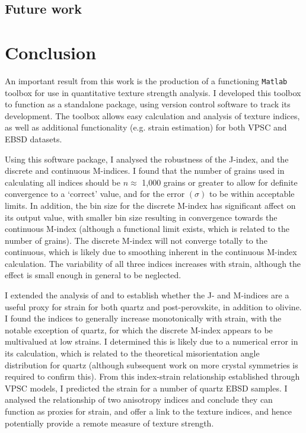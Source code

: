 \documentclass[a4paper,12pt,twoside]{report}
\numberwithin{equation}{chapter}
\begin{document}
\section{Future work}


\chapter{Conclusion} \label{chap:conclusion}
\vspace{-1cm}
An important result from this work is the production of a functioning \texttt{Matlab} toolbox for use in quantitative texture strength analysis. I developed this toolbox to function as a standalone package, using version control software to track its development. The toolbox allows easy calculation and analysis of texture indices, as well as additional functionality (e.g. strain estimation) for both VPSC and EBSD datasets. 

Using this software package, I analysed the robustness of the J-index, and the discrete and continuous M-indices. I found that the number of grains used in calculating all indices should be $n \approx$ 1,000 grains or greater to allow for definite convergence to a \lq{}correct\rq{} value, and for the error $(\sigma)$ to be within acceptable limits. In addition, the bin size for the discrete M-index has significant affect on its output value, with smaller bin size resulting in convergence towards the continuous M-index (although a functional limit exists, which is related to the number of grains). The discrete M-index will not converge totally to the continuous, which is likely due to smoothing inherent in the continuous M-index calculation. The variability of all three indices increases with strain, although the effect is small enough in general to be neglected.

I extended the analysis of \cite{Skemer} and \cite{Mainprice} to establish whether the J- and M-indices are a useful proxy for strain for both quartz and post-perovskite, in addition to olivine. I found the indices to generally increase monotonically with strain, with the notable exception of quartz, for which the discrete M-index appears to be multivalued at low strains. I determined this is likely due to a numerical error in its calculation, which is related to the theoretical misorientation angle distribution for quartz (although subsequent work on more crystal symmetries is required to confirm this). From this index-strain relationship established through VPSC models, I predicted the strain for a number of quartz EBSD samples. I analysed the relationship of two anisotropy indices and conclude they can function as proxies for strain, and offer a link to the texture indices, and hence potentially provide a remote measure of texture strength.
\end{document}
